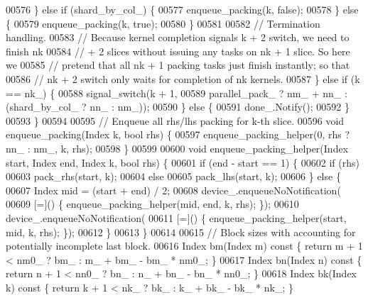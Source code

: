 \begin{DoxyCode}
00576         \} \textcolor{keywordflow}{else} \textcolor{keywordflow}{if} (shard\_by\_col\_) \{
00577           enqueue\_packing(k, \textcolor{keyword}{false});
00578         \} \textcolor{keywordflow}{else} \{
00579           enqueue\_packing(k, \textcolor{keyword}{true});
00580         \}
00581 
00582         \textcolor{comment}{// Termination handling.}
00583         \textcolor{comment}{// Because kernel completion signals k + 2 switch, we need to finish nk}
00584         \textcolor{comment}{// + 2 slices without issuing any tasks on nk + 1 slice. So here we}
00585         \textcolor{comment}{// pretend that all nk + 1 packing tasks just finish instantly; so that}
00586         \textcolor{comment}{// nk + 2 switch only waits for completion of nk kernels.}
00587       \} \textcolor{keywordflow}{else} \textcolor{keywordflow}{if} (k == nk\_) \{
00588         signal\_switch(k + 1,
00589                       parallel\_pack\_ ? nm\_ + nn\_ : (shard\_by\_col\_ ? nn\_ : nm\_));
00590       \} \textcolor{keywordflow}{else} \{
00591         done\_.Notify();
00592       \}
00593     \}
00594 
00595     \textcolor{comment}{// Enqueue all rhs/lhs packing for k-th slice.}
00596     \textcolor{keywordtype}{void} enqueue\_packing(Index k, \textcolor{keywordtype}{bool} rhs) \{
00597       enqueue\_packing\_helper(0, rhs ? nn\_ : nm\_, k, rhs);
00598     \}
00599 
00600     \textcolor{keywordtype}{void} enqueue\_packing\_helper(Index start, Index end, Index k, \textcolor{keywordtype}{bool} rhs) \{
00601       \textcolor{keywordflow}{if} (end - start == 1) \{
00602         \textcolor{keywordflow}{if} (rhs)
00603           pack\_rhs(start, k);
00604         \textcolor{keywordflow}{else}
00605           pack\_lhs(start, k);
00606       \} \textcolor{keywordflow}{else} \{
00607         Index mid = (start + end) / 2;
00608         device\_.enqueueNoNotification(
00609             [=]() \{ enqueue\_packing\_helper(mid, end, k, rhs); \});
00610         device\_.enqueueNoNotification(
00611             [=]() \{ enqueue\_packing\_helper(start, mid, k, rhs); \});
00612       \}
00613     \}
00614 
00615     \textcolor{comment}{// Block sizes with accounting for potentially incomplete last block.}
00616     Index bm(Index m)\textcolor{keyword}{ const }\{ \textcolor{keywordflow}{return} m + 1 < nm0\_ ? bm\_ : m\_ + bm\_ - bm\_ * nm0\_; \}
00617     Index bn(Index n)\textcolor{keyword}{ const }\{ \textcolor{keywordflow}{return} n + 1 < nn0\_ ? bn\_ : n\_ + bn\_ - bn\_ * nn0\_; \}
00618     Index bk(Index k)\textcolor{keyword}{ const }\{ \textcolor{keywordflow}{return} k + 1 < nk\_ ? bk\_ : k\_ + bk\_ - bk\_ * nk\_; \}

\end{DoxyCode}
